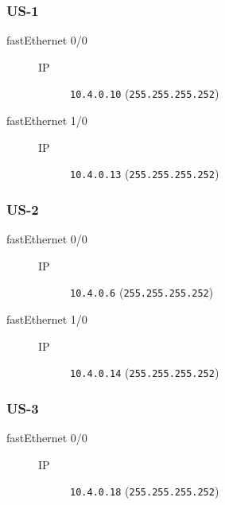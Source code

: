 \subsubsection{US-1}

	\begin{description}
		\item[fastEthernet 0/0] 
		\begin{description}
			\item[IP] \texttt{10.4.0.10} (\texttt{255.255.255.252})
		\end{description}

		\item[fastEthernet 1/0] 
		\begin{description}
			\item[IP] \texttt{10.4.0.13} (\texttt{255.255.255.252})
		\end{description}

	\end{description}
\subsubsection{US-2}

	\begin{description}
		\item[fastEthernet 0/0] 
		\begin{description}
			\item[IP] \texttt{10.4.0.6} (\texttt{255.255.255.252})
		\end{description}

		\item[fastEthernet 1/0] 
		\begin{description}
			\item[IP] \texttt{10.4.0.14} (\texttt{255.255.255.252})
		\end{description}

	\end{description}
\subsubsection{US-3}

	\begin{description}
		\item[fastEthernet 0/0] 
		\begin{description}
			\item[IP] \texttt{10.4.0.18} (\texttt{255.255.255.252})
		\end{description}

	\end{description}
